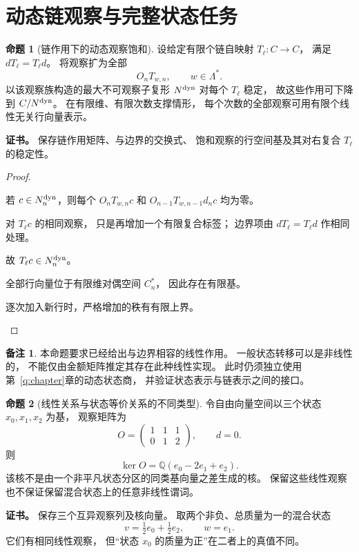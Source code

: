 \documentclass[UTF8,12pt,a4paper,openany,fontset=none,zihao=false]{ctexrep}
\theoremstyle{definition}
\newtheorem{proposition}{命题}[chapter]
\newtheorem{remark}{备注}[chapter]
\newenvironment{certificate}{\par\noindent\textbf{证书。}\ignorespaces}{\par}
\newcommand{\1}{\mathbf 1}
\begin{document}
\section{动态链观察与完整状态任务}
\begin{proposition}[链作用下的动态观察饱和]
\label{ch:dynamic-observations}
设给定有限个链自映射 \(T_\ell:C\to C\)，
满足 \(dT_\ell=T_\ell d\)。
将观察扩为全部
\[
O_nT_{w,n},\qquad w\in\Lambda^*.
\]
以该观察族构造的最大不可观察子复形 \(N^{\rm dyn}\)
对每个 \(T_\ell\) 稳定，
故这些作用可下降到 \(C/N^{\rm dyn}\)。
在有限维、有限次数支撑情形，
每个次数的全部观察可用有限个线性无关行向量表示。
\end{proposition}
\begin{certificate}
保存链作用矩阵、与边界的交换式、
饱和观察的行空间基及其对右复合 \(T_\ell\) 的稳定性。
\end{certificate}
\begin{proof}
\begin{semanticsteps}
\item 若 \(c\in N_n^{\rm dyn}\)，则每个
\(O_nT_{w,n}c\) 和
\(O_{n-1}T_{w,n-1}d_nc\) 均为零。
\item 对 \(T_\ell c\) 的相同观察，
只是再增加一个有限复合标签；
边界项由 \(dT_\ell=T_\ell d\) 作相同处理。
\item 故 \(T_\ell c\in N_n^{\rm dyn}\)。
\item 全部行向量位于有限维对偶空间 \(C_n^*\)，
因此存在有限基。
\item 逐次加入新行时，严格增加的秩有有限上界。
\end{semanticsteps}
\end{proof}
\begin{remark}
本命题要求已经给出与边界相容的线性作用。
一般状态转移可以是非线性的，
不能仅由金额矩阵推定其存在此种线性实现。
此时仍须独立使用第~\ref{q:chapter}章的动态状态商，
并验证状态表示与链表示之间的接口。
\end{remark}
\begin{proposition}[线性关系与状态等价关系的不同类型]
\label{ch:linear-state}
令自由向量空间以三个状态 \(x_0,x_1,x_2\) 为基，
观察矩阵为
\[
O=
\begin{pmatrix}
1&1&1\\
0&1&2
\end{pmatrix},
\qquad d=0.
\]
则
\[
\ker O=\mathbb Q(e_0-2e_1+e_2).
\]
该核不是由一个非平凡状态分区的同类基向量之差生成的核。
保留这些线性观察也不保证保留混合状态上的任意非线性谓词。
\end{proposition}
\begin{certificate}
保存三个互异观察列及核向量。
取两个非负、总质量为一的混合状态
\[
v=\tfrac12e_0+\tfrac12e_2,\qquad w=e_1.
\]
它们有相同线性观察，
但“状态 \(x_0\) 的质量为正”在二者上的真值不同。
\end{certificate}
\end{document}
